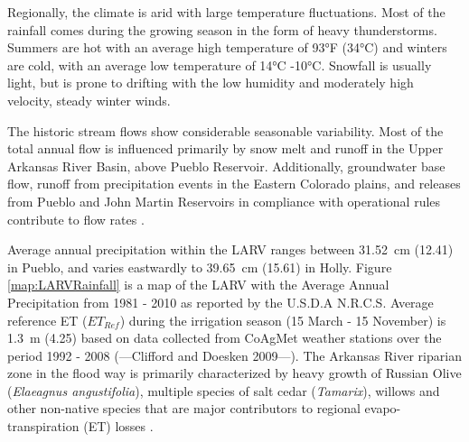 \begin{linenumbers}[1]
Regionally, the climate is arid with large temperature fluctuations.  Most of the rainfall comes during the growing season in the form of heavy thunderstorms.  Summers are hot with an average high temperature of \ang{93}F (\ang{34}C) and winters are cold, with an average low temperature of \ang{14}C \ang{-10}C.  Snowfall is usually light, but is prone to drifting with the low humidity and moderately high velocity, steady winter winds.

The historic stream flows show considerable seasonable variability.  Most of the total annual flow is influenced primarily by snow melt and runoff in the Upper Arkansas River Basin, above Pueblo Reservoir.  Additionally, groundwater base flow, runoff from precipitation events in the Eastern Colorado plains, and releases from Pueblo and John Martin Reservoirs in compliance with operational rules contribute to flow rates \citep{Miller2010}.

Average annual precipitation within the LARV ranges between \SI{31.52}{\centi\meter} (\SI{12.41}{\inch}) in Pueblo, and varies eastwardly to \SI{39.65}{\centi\meter} (\SI{15.61}{\inch}) in Holly.  Figure \ref{map:LARVRainfall} is a map of the LARV with the Average Annual Precipitation from 1981 - 2010 as reported by the U.S.D.A N.R.C.S.  Average reference ET ($ ET_{Ref} $) during the irrigation season (15 March - 15 November) is \SI{1.3}{\meter} (\SI{4.25}{\foot}) based on data collected from CoAgMet weather stations over the period 1992 - 2008 (---Clifford and Doesken 2009---).  The Arkansas River riparian zone in the flood way is primarily characterized by heavy growth of Russian Olive (\textit{Elaeagnus angustifolia}), multiple species of salt cedar (\textit{Tamarix}), willows and other non-native species that are major contributors to regional evapo-transpiration (ET) losses \citep{Nagler2010a}.



\end{linenumbers}
